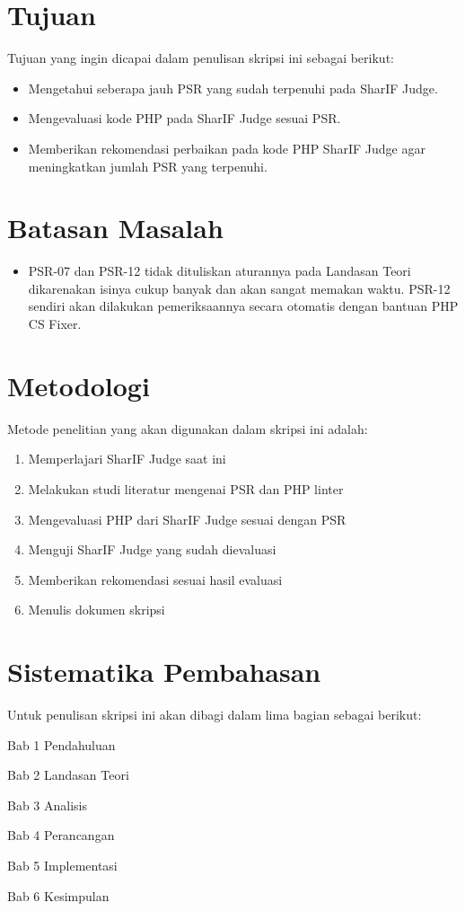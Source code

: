 
\section{Tujuan}
\label{sec:tujuan}
Tujuan yang ingin dicapai dalam penulisan skripsi ini sebagai berikut:
\begin{itemize}
	\item Mengetahui seberapa jauh PSR yang sudah terpenuhi pada SharIF Judge.
	\item Mengevaluasi kode PHP pada SharIF Judge sesuai PSR.
	\item Memberikan rekomendasi perbaikan pada kode PHP SharIF Judge agar meningkatkan jumlah PSR yang terpenuhi.
\end{itemize}


\section{Batasan Masalah}
\label{sec:batasan}
\begin{itemize}
	\item PSR-07 dan PSR-12 tidak dituliskan aturannya pada Landasan Teori dikarenakan isinya cukup banyak dan akan sangat memakan waktu. PSR-12 sendiri akan dilakukan pemeriksaannya secara otomatis dengan bantuan PHP CS Fixer.
	
\end{itemize}



\section{Metodologi}
\label{sec:metlit}
Metode penelitian yang akan digunakan dalam skripsi ini adalah:
\begin{enumerate}
	\item Memperlajari SharIF Judge saat ini
	\item Melakukan studi literatur mengenai PSR dan PHP linter
	\item Mengevaluasi PHP dari SharIF Judge sesuai dengan PSR
	\item Menguji SharIF Judge yang sudah dievaluasi
	\item Memberikan rekomendasi sesuai hasil evaluasi
	\item Menulis dokumen skripsi
\end{enumerate}


\section{Sistematika Pembahasan}
\label{sec:sispem}
Untuk penulisan skripsi ini akan dibagi dalam lima bagian sebagai berikut:

Bab 1 Pendahuluan

Bab 2 Landasan Teori 

Bab 3 Analisis

Bab 4 Perancangan

Bab 5 Implementasi

Bab 6 Kesimpulan

